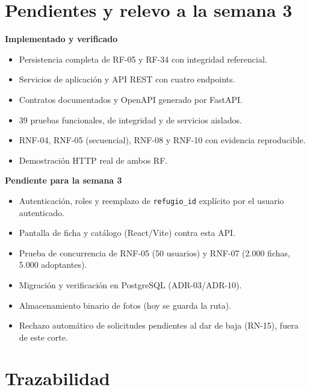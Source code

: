 \documentclass[11pt,a4paper]{article}
\newcommand{\code}[1]{\texttt{#1}}
\begin{document}
\section{Pendientes y relevo a la semana 3}

\textbf{Implementado y verificado}

\begin{itemize}
\item Persistencia completa de RF-05 y RF-34 con integridad referencial.
\item Servicios de aplicación y API REST con cuatro endpoints.
\item Contratos documentados y OpenAPI generado por FastAPI.
\item 39 pruebas funcionales, de integridad y de servicios aislados.
\item RNF-04, RNF-05 (secuencial), RNF-08 y RNF-10 con evidencia reproducible.
\item Demostración HTTP real de ambos RF.
\end{itemize}

\textbf{Pendiente para la semana 3}

\begin{itemize}
\item Autenticación, roles y reemplazo de \code{refugio\_id} explícito por el
  usuario autenticado.
\item Pantalla de ficha y catálogo (React/Vite) contra esta API.
\item Prueba de concurrencia de RNF-05 (50 usuarios) y RNF-07 (2.000 fichas,
  5.000 adoptantes).
\item Migración y verificación en PostgreSQL (ADR-03/ADR-10).
\item Almacenamiento binario de fotos (hoy se guarda la ruta).
\item Rechazo automático de solicitudes pendientes al dar de baja (RN-15),
  fuera de este corte.
\end{itemize}

\section{Trazabilidad}
\end{document}
